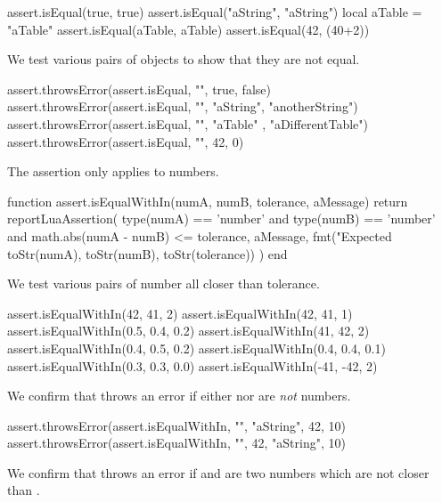 \startLuaTest
  assert.isEqual(true, true)
  assert.isEqual("aString", "aString")
  local aTable = { "aTable" }
  assert.isEqual(aTable, aTable)
  assert.isEqual(42, (40+2))
\stopLuaTest
\stopTestCase


We test various pairs of objects to show that they are not equal. 

\startLuaTest
  assert.throwsError(assert.isEqual, "", true, false)
  assert.throwsError(assert.isEqual, "",
    "aString", "anotherString")
  assert.throwsError(assert.isEqual, "",
    { "aTable" }, { "aDifferentTable"})
  assert.throwsError(assert.isEqual, "", 42, 0)
\stopLuaTest
\stopTestCase

\stopTestSuite


The  assertion only applies to numbers.

\startLuaCode
function assert.isEqualWithIn(numA, numB,
  tolerance, aMessage)
  return reportLuaAssertion(
    type(numA) == 'number' and type(numB) == 'number'
    and math.abs(numA - numB) <= tolerance,
    aMessage,
    fmt("Expected %
      toStr(numA), toStr(numB), toStr(tolerance))
  )
end
\stopLuaCode


We test various pairs of number all closer than tolerance. 

\startLuaTest
  assert.isEqualWithIn(42, 41, 2)
  assert.isEqualWithIn(42, 41, 1)
  assert.isEqualWithIn(0.5, 0.4, 0.2)
  assert.isEqualWithIn(41, 42, 2)
  assert.isEqualWithIn(0.4, 0.5, 0.2)
  assert.isEqualWithIn(0.4, 0.4, 0.1)
  assert.isEqualWithIn(0.3, 0.3, 0.0)
  assert.isEqualWithIn(-41, -42, 2)
\stopLuaTest
\stopTestCase


We confirm that  throws an error if either 
 nor  are \emph{not} numbers.

\startLuaTest
  assert.throwsError(assert.isEqualWithIn, "", "aString", 42, 10)
  assert.throwsError(assert.isEqualWithIn, "", 42, "aString", 10)
\stopLuaTest
\stopTestCase


We confirm that  throws an error if  
and  are two numbers which are not closer than 
. 

